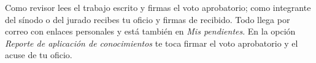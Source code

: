 \documentclass[11pt,a4paper]{article}
\begin{document}
{\small\tableofcontents}
\newpage
\begin{quevasahacer}
Como revisor lees el trabajo escrito y firmas el voto aprobatorio; como integrante del sínodo o del jurado recibes tu oficio y firmas de recibido. Todo llega por correo con enlaces personales y está también en \emph{Mis pendientes}. En la opción \emph{Reporte de aplicación de conocimientos} te toca firmar el voto aprobatorio y el acuse de tu oficio.
\end{quevasahacer}



\end{document}
